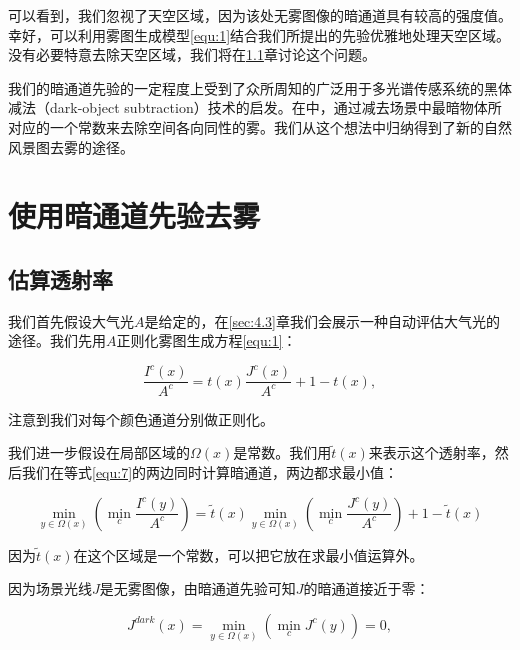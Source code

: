 \documentclass{ctexart}
\begin{document}
可以看到，我们忽视了天空区域，因为该处无雾图像的暗通道具有较高的强度值。幸好，可以利用雾图生成模型\ref{equ:1}结合我们所提出的先验优雅地处理天空区域。没有必要特意去除天空区域，我们将在\ref{sec:4.1}章讨论这个问题。\par

我们的暗通道先验的一定程度上受到了众所周知的广泛用于多光谱传感系统的黑体减法（dark-object subtraction）技术\cite{Chavez1988}的启发。在\cite{Chavez1988}中，通过减去场景中最暗物体所对应的一个常数来去除空间各向同性的雾。我们从这个想法中归纳得到了新的自然风景图去雾的途径。\par



\section{使用暗通道先验去雾}

\subsection{估算透射率}\label{sec:4.1}
我们首先假设大气光$A$是给定的，在\ref{sec:4.3}章我们会展示一种自动评估大气光的途径。我们先用$A$正则化雾图生成方程\ref{equ:1}：

\begin{equation}\label{equ:7}
	\frac{I^c(x)}{A^c} = t(x)\frac{J^c(x)}{A^c}  + 1 - t(x),
\end{equation}

注意到我们对每个颜色通道分别做正则化。\par

我们进一步假设在局部区域的$\Omega(x)$是常数。我们用$\tilde{t}(x)$来表示这个透射率，然后我们在等式\ref{equ:7}的两边同时计算暗通道，两边都求最小值：

\begin{equation}\label{equ:8}
	\min_{y \in \Omega(x)} (\min_c \frac{I^c(y)}{A^c}) = \tilde{t}(x) \min_{y \in \Omega(x)} (\min_c \frac{J^c(y)}{A^c}) + 1 - \tilde{t}(x)
\end{equation}

因为$\tilde{t}(x)$在这个区域是一个常数，可以把它放在求最小值运算外。\par

因为场景光线$J$是无雾图像，由暗通道先验可知$J$的暗通道接近于零：

\begin{equation}\label{equ:9}
	J^{dark}(x) = \min_{y \in \Omega(x)} (\min_c J^c(y)) = 0,
\end{equation}
\end{document}
